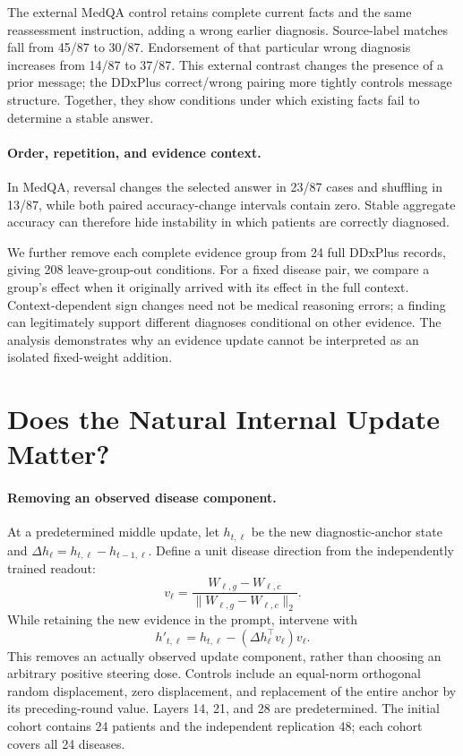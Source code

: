 \documentclass[11pt]{article}
\begin{document}
The external MedQA control retains complete current facts and the same reassessment instruction, adding a wrong earlier diagnosis. Source-label matches fall from 45/87 to 30/87. Endorsement of that particular wrong diagnosis increases from 14/87 to 37/87. This external contrast changes the presence of a prior message; the DDxPlus correct/wrong pairing more tightly controls message structure. Together, they show conditions under which existing facts fail to determine a stable answer.

\paragraph{Order, repetition, and evidence context.}

In MedQA, reversal changes the selected answer in 23/87 cases and shuffling in 13/87, while both paired accuracy-change intervals contain zero. Stable aggregate accuracy can therefore hide instability in which patients are correctly diagnosed.

We further remove each complete evidence group from 24 full DDxPlus records, giving 208 leave-group-out conditions. For a fixed disease pair, we compare a group's effect when it originally arrived with its effect in the full context. \ContextResult{} Context-dependent sign changes need not be medical reasoning errors; a finding can legitimately support different diagnoses conditional on other evidence. The analysis demonstrates why an evidence update cannot be interpreted as an isolated fixed-weight addition.

\section{Does the Natural Internal Update Matter?}
\paragraph{Removing an observed disease component.}
At a predetermined middle update, let $h_{t,\ell}$ be the new diagnostic-anchor state and $\Delta h_\ell=h_{t,\ell}-h_{t-1,\ell}$. Define a unit disease direction from the independently trained readout:
\begin{equation}
 v_\ell=\frac{W_{\ell,g}-W_{\ell,c}}{\|W_{\ell,g}-W_{\ell,c}\|_2}.
\end{equation}
While retaining the new evidence in the prompt, intervene with
\begin{equation}
 h'_{t,\ell}=h_{t,\ell}-(\Delta h_\ell^\top v_\ell)v_\ell.
\end{equation}
This removes an actually observed update component, rather than choosing an arbitrary positive steering dose. Controls include an equal-norm orthogonal random displacement, zero displacement, and replacement of the entire anchor by its preceding-round value. Layers 14, 21, and 28 are predetermined. The initial cohort contains 24 patients and the independent replication 48; each cohort covers all 24 diseases.
\end{document}
